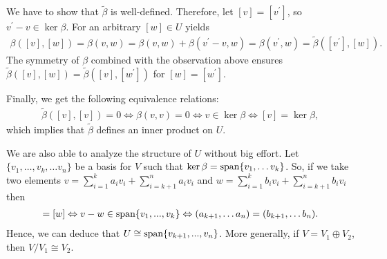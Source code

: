 We have to show that $ \tilde{\beta} $ is well-defined. Therefore, let $ [v]=[v^{\prime}] $, so $v^{\prime}-v \in \ker \beta $. 
For an arbitrary $ [w] \in U $ yields 
\begin{align*}
	\beta([v],[w]) = \beta(v,w) = \beta(v,w)+\beta(v^{\prime}-v,w)= \beta(v^{\prime},w) = \tilde{\beta}([v^{\prime}],[w]).
\end{align*}
The symmetry of $ \beta $ combined with the observation above ensures $ \tilde{\beta}([v],[w]) = \tilde{\beta}([v],[w^{\prime}]) $ for $ [w]= [w^{\prime}] $.

Finally, we get the following equivalence relations: 
\begin{align*}
	\tilde{\beta}([v],[v]) = 0 \Leftrightarrow \beta(v,v) = 0 \Leftrightarrow v \in \ker \beta \Leftrightarrow [v]= \ker \beta,
\end{align*}
which implies that $ \tilde{\beta} $ defines an inner product on $ U $. 

We are also able to analyze the structure of $ U $ without big effort. Let $ \{ v_1,\hdots,v_k, \hdots v_n \} $ be a basis for $ V $ such that $ \ker \beta = \textup{span} \{ v_1,\hdots v_k \}$. So, if we take two elements 
$ v = \sum_{i=1}^{k}a_iv_i + \sum_{i=k+1}^{n}a_iv_i$ and $ w = \sum_{i=1}^{k}b_iv_i + \sum_{i=k+1}^{n}b_iv_i $ then 
\begin{align*}
	[v] = [w] \Leftrightarrow v-w \in \textup{span} \{  v_1,...,v_k \} \Leftrightarrow (a_{k+1},\hdots a_n) = (b_{k+1},\hdots b_n).
\end{align*} 
Hence, we can deduce that $ U \cong \textup{span} \{ v_{k+1},...,v_n \} $. More generally, if $ V = V_1 \oplus V_2 $, then $ V/V_1 \cong V_2 $.